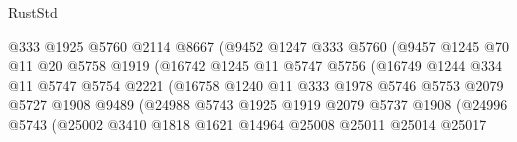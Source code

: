 \begin{lexlean}{RustStd}
\begin{coremodule}
{\begin{coremodule}
{{{{{{{{{{{{{{{{{{{{{{{{{{{{{{{{{{{{{{{{{{{                                @333
                                @1925
                                @5760
                                @2114
                                @8667
                                (@9452
                                  @1247
                                  @333
                                  @5760
                                  (@9457
                                    @1245
                                    @70
                                    @11
                                    @20
                                    @5758
                                    @1919
                                    (@16742
                                      @1245
                                      @11
                                      @5747
                                      @5756
                                      (@16749
                                        @1244
                                        @334
                                        @11
                                        @5747
                                        @5754
                                        @2221
                                        (@16758
                                          @1240
                                          @11
                                          @333
                                          @1978
                                          @5746
                                          @5753
                                          @2079
                                          @5727
                                          @1908
                                          @9489
                                          (@24988
                                            @5743
                                            @1925
                                            @1919
                                            @2079
                                            @5737
                                            @1908
                                            (@24996
                                              @5743
                                              (@25002
                                                @3410
                                                @1818
                                                @1621
                                                @14964
                                                @25008
                                                @25011
                                                @25014
                                                @25017
}}}}}}}}}}}}}}}}}}}}}}}}}}}}}}}}}}}}}}}}}}}
\end{coremodule}}
\end{coremodule}
\end{lexlean}
